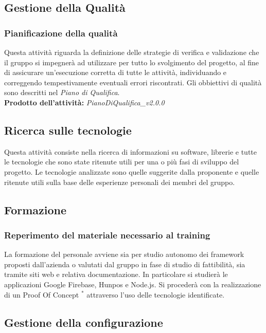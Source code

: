 \documentclass[11pt,a4paper]{article}
\begin{document}
{	\subsection{Gestione della Qualità}
	\subsubsection{Pianificazione della qualità}
	Questa attività riguarda la definizione delle strategie di verifica e validazione che il gruppo si impegnerà ad utilizzare per tutto lo svolgimento del progetto, al fine di assicurare un'esecuzione corretta di tutte le attività, individuando e correggendo tempestivamente eventuali errori riscontrati. Gli obbiettivi di qualità sono descritti nel \textit{Piano di Qualifica}.\\
	\textbf{Prodotto dell'attività:} \textit{PianoDiQualifica\_v2.0.0}
	
	\subsection{Ricerca sulle tecnologie} 
	Questa attività consiste nella ricerca di informazioni su software, librerie e tutte le tecnologie che sono state ritenute utili per una o più fasi di sviluppo del progetto. Le tecnologie analizzate  sono quelle suggerite dalla proponente e quelle ritenute utili sulla base delle esperienze personali dei membri del gruppo.
	
	\subsection{Formazione}
	\subsubsection{Reperimento del materiale necessario al training}
	La formazione del personale avviene sia per studio autonomo dei framework proposti dall’azienda o valutati dal gruppo in fase di studio di fattibilità, sia tramite siti web e relativa documentazione. In particolare si studierà le applicazioni Google Firebase, Hunpos e Node.js. Si procederà con la realizzazione di un Proof Of Concept $^*$ attraverso l’uso delle tecnologie identificate.
	\\
\subsection{Gestione della configurazione}
}
\end{document}
